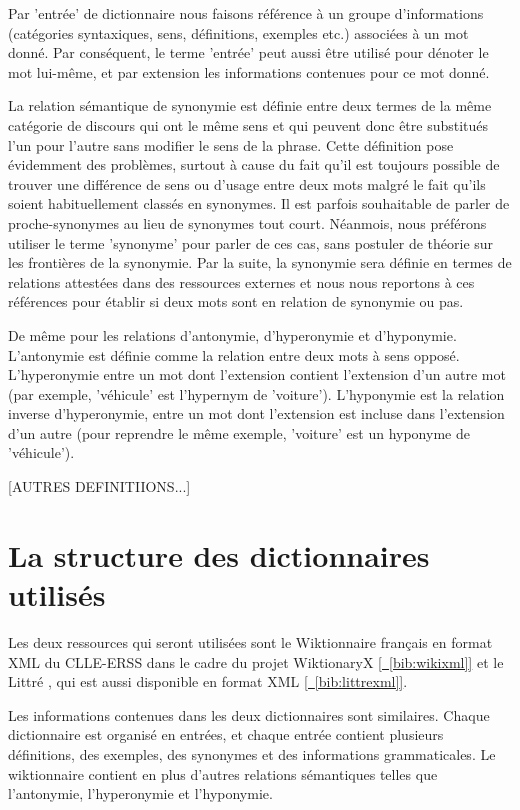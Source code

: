 \documentclass[a4paper, 12pt]{article}
\begin{document}
Par 'entrée' de dictionnaire nous faisons référence à un groupe d'informations 
(catégories syntaxiques, sens, définitions, exemples etc.) associées à un mot 
donné. Par conséquent, le terme 'entrée' peut aussi être utilisé pour dénoter 
le mot lui-même, et par extension les informations contenues pour ce mot donné.

La relation sémantique de synonymie est définie entre deux termes de la même 
catégorie de discours qui ont le même sens et qui peuvent donc être substitués 
l'un pour l'autre sans modifier le sens de la phrase. Cette définition pose 
évidemment des problèmes, surtout à cause du fait qu'il est toujours possible 
de trouver une différence de sens ou d'usage entre deux mots malgré le fait 
qu'ils soient habituellement classés en synonymes. Il est parfois souhaitable 
de parler de proche-synonymes au lieu de synonymes tout court. Néanmois, 
nous préférons utiliser le terme 'synonyme' pour parler de ces cas, sans 
postuler de théorie sur les frontières de la synonymie. Par la suite, la 
synonymie sera définie en termes de relations attestées dans des ressources 
externes et nous nous reportons à ces références pour établir si deux mots sont 
en relation de synonymie ou pas.

De même pour les relations d'antonymie, d'hyperonymie et d'hyponymie. 
L'antonymie est définie comme la relation entre deux mots à sens opposé. 
L'hyperonymie entre un mot dont l'extension contient l'extension d'un autre mot 
(par exemple, 'véhicule' est l'hypernym de 'voiture'). L'hyponymie est la 
relation inverse d'hyperonymie, entre un mot dont l'extension est incluse dans 
l'extension d'un autre (pour reprendre le même exemple, 'voiture' est un 
hyponyme de 'véhicule').

[AUTRES DEFINITIIONS...]

\section{La structure des dictionnaires utilisés}

Les deux ressources qui seront utilisées sont le Wiktionnaire français en 
format XML du CLLE-ERSS dans le cadre du projet WiktionaryX 
\hyperref[bib:wikixml]{[~\ref*{bib:wikixml}]} et le Littré , qui est aussi 
disponible en format XML \hyperref[bib:littrexml]{[~\ref*{bib:littrexml}]}.

Les informations contenues dans les deux dictionnaires sont similaires. Chaque 
dictionnaire est organisé en entrées, et chaque entrée contient plusieurs 
définitions, des exemples, des synonymes et des informations grammaticales. Le 
wiktionnaire contient en plus d'autres relations sémantiques telles que 
l'antonymie, l'hyperonymie et l’hyponymie.
\end{document}
